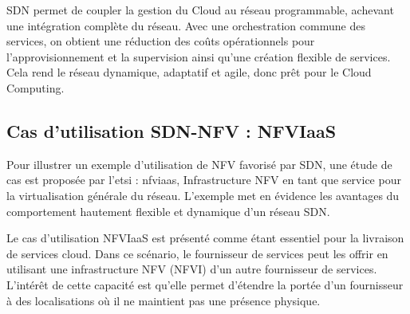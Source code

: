 SDN permet de coupler la gestion du Cloud au réseau programmable, achevant une intégration complète du réseau. Avec une orchestration commune des services, on obtient une réduction des coûts opérationnels pour l'approvisionnement et la supervision ainsi qu'une création flexible de services. Cela rend le réseau dynamique, adaptatif et agile, donc prêt pour le Cloud Computing. \cite{OFSDNNFVand} \cite{realTimeCloudNetworkEnabled} 


\subsection{Cas d'utilisation SDN-NFV : NFVIaaS}

Pour illustrer un exemple d'utilisation de NFV favorisé par SDN, une étude de cas est proposée par l'\gls{etsi} : \gls{nfv}\gls{iaas}, Infrastructure NFV en tant que service pour la virtualisation générale du réseau. L'exemple met en évidence les avantages du comportement hautement flexible et dynamique d'un réseau SDN.

Le cas d'utilisation NFVIaaS est présenté comme étant essentiel pour la livraison de services cloud. Dans ce scénario, le fournisseur de services peut les offrir en utilisant une infrastructure NFV (NFVI) d'un autre fournisseur de services. L'intérêt de cette capacité est qu'elle permet d'étendre la portée d'un fournisseur à des localisations où il ne maintient pas une présence physique.

